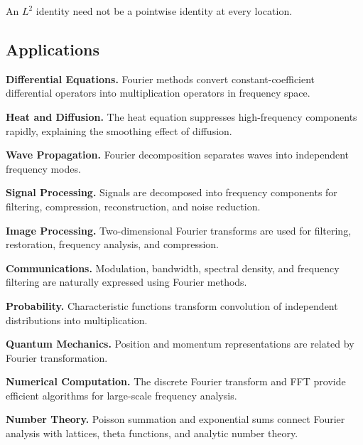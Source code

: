 An \(L^2\) identity need not be a pointwise identity at every location.

\subsection{Applications}
\label{subsec:fourier-analysis-applications}

\begin{applicationbox}
\textbf{Differential Equations.}
Fourier methods convert constant-coefficient differential operators into
multiplication operators in frequency space.

\medskip

\textbf{Heat and Diffusion.}
The heat equation suppresses high-frequency components rapidly, explaining
the smoothing effect of diffusion.

\medskip

\textbf{Wave Propagation.}
Fourier decomposition separates waves into independent frequency modes.

\medskip

\textbf{Signal Processing.}
Signals are decomposed into frequency components for filtering,
compression, reconstruction, and noise reduction.

\medskip

\textbf{Image Processing.}
Two-dimensional Fourier transforms are used for filtering, restoration,
frequency analysis, and compression.

\medskip

\textbf{Communications.}
Modulation, bandwidth, spectral density, and frequency filtering are
naturally expressed using Fourier methods.

\medskip

\textbf{Probability.}
Characteristic functions transform convolution of independent
distributions into multiplication.

\medskip

\textbf{Quantum Mechanics.}
Position and momentum representations are related by Fourier
transformation.

\medskip

\textbf{Numerical Computation.}
The discrete Fourier transform and FFT provide efficient algorithms for
large-scale frequency analysis.

\medskip

\textbf{Number Theory.}
Poisson summation and exponential sums connect Fourier analysis with
lattices, theta functions, and analytic number theory.
\end{applicationbox}

